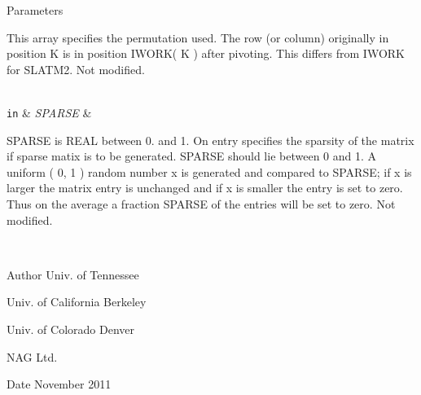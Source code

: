\begin{DoxyParams}[1]{Parameters}
\begin{DoxyVerb}
           This array specifies the permutation used. The
           row (or column) originally in position K is in
           position IWORK( K ) after pivoting.
           This differs from IWORK for SLATM2. Not modified.\end{DoxyVerb}
\\
\hline
\mbox{\tt in}  & {\em S\+P\+A\+R\+S\+E} & \begin{DoxyVerb}          SPARSE is REAL between 0. and 1.
           On entry specifies the sparsity of the matrix
           if sparse matix is to be generated.
           SPARSE should lie between 0 and 1.
           A uniform ( 0, 1 ) random number x is generated and
           compared to SPARSE; if x is larger the matrix entry
           is unchanged and if x is smaller the entry is set
           to zero. Thus on the average a fraction SPARSE of the
           entries will be set to zero.
           Not modified.\end{DoxyVerb}
 \\
\hline
\end{DoxyParams}
\begin{DoxyAuthor}{Author}
Univ. of Tennessee 

Univ. of California Berkeley 

Univ. of Colorado Denver 

N\+A\+G Ltd. 
\end{DoxyAuthor}
\begin{DoxyDate}{Date}
November 2011 
\end{DoxyDate}
\hypertarget{group__real__matgen_ga6c74139d5b1727c2b6a4ade4c349bd6b}{}
